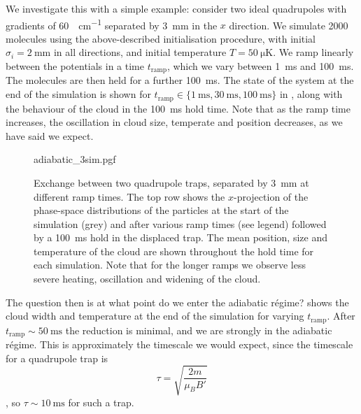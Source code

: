 We investigate this with a simple example: consider two ideal quadrupoles
with gradients of \SI{60}{\gauss\per\centi\meter} separated by
\SI{3}{\milli\meter} in the $x$ direction. We simulate 2000 \CaF{} molecules
using the above-described initialisation procedure, with initial $\sigma_i =
\SI{2}{\milli\meter}$ in all directions, and initial temperature
$T=\SI{50}{\micro\kelvin}$. We ramp linearly between the potentials in a time
$t_\text{ramp}$, which we vary between \SI{1}{\milli\second} and
\SI{100}{\milli\second}. The molecules are then held for a further
\SI{100}{\milli\second}. The state of the system at the end of the simulation
is shown for $t_\text{ramp}\in \{\SI{1}{\milli\second}, \SI{30}{\milli\second},
\SI{100}{\milli\second}\}$ in , along with the
behaviour of the cloud in the \SI{100}{\milli\second} hold time. Note that as
the ramp time increases, the oscillation in cloud size, temperate and position
decreases, as we have said we expect.

\begin{figure}[p]
\centering
  {adiabatic_3sim.pgf}
  \caption{
    Exchange between two quadrupole traps, separated by \SI{3}{\milli\meter} at
    different ramp times. The top row shows the $x$-projection of the
    phase-space distributions of the particles at the start of the simulation
    (grey) and after various ramp times (see legend) followed by a
    \SI{100}{\milli\second} hold in the displaced trap. The mean position, size and
    temperature of the cloud are shown throughout the hold time for each
    simulation. Note that for the longer ramps we observe less severe heating,
    oscillation and widening of the cloud.
  }
  \label{design:fig:adia3sim}
\end{figure}


The question then is at what point do we enter the adiabatic r\'egime?
 shows the cloud width and temperature at the end
of the simulation for varying $t_\text{ramp}$. After
$t_\text{ramp}\sim\SI{50}{\milli\second}$ the reduction is minimal, and we are
strongly in the adiabatic r\'egime. This is approximately the timescale we
would expect, since the timescale for a quadrupole trap is
%
\begin{equation}
  \tau = \sqrt{\frac{2 m }{\mu_B B'}}
\end{equation}
%
, so $\tau \sim
\SI{10}{\milli\second}$ for such a trap. 

